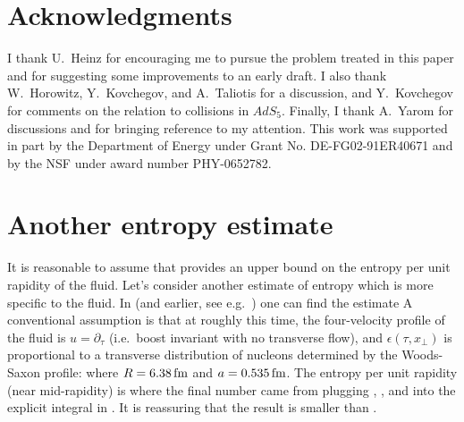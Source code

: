 \documentclass[12pt]{article}
\begin{document}
\section*{Acknowledgments}

I thank U.~Heinz for encouraging me to pursue the problem treated in this paper and for suggesting some improvements to an early draft.  I also thank W.~Horowitz, Y.~Kovchegov, and A.~Taliotis for a discussion, and Y.~Kovchegov for comments on the relation to collisions in $AdS_5$.  Finally, I thank A.~Yarom for discussions and for bringing reference \cite{Loganayagam:2008is} to my attention.  This work was supported in part by the Department of Energy under Grant No. DE-FG02-91ER40671 and by the NSF under award number PHY-0652782.




\appendix
\section{Another entropy estimate}

It is reasonable to assume that  provides an upper bound on the entropy per unit rapidity of the fluid.  Let's consider another estimate of entropy which is more specific to the fluid.  In \cite{Adcox:2004mh} (and earlier, see e.g.~\cite{Heinz:2002un}) one can find the estimate 
A conventional assumption is that at roughly this time, the four-velocity profile of the fluid is $u = \partial_\tau$ (i.e.~boost invariant with no transverse flow), and $\epsilon(\tau,x_\perp)$ is proportional to a transverse distribution of nucleons determined by the Woods-Saxon profile:
where $R = 6.38\,{\rm fm}$ and $a = 0.535\,{\rm fm}$.  The entropy per unit rapidity (near mid-rapidity) is
where the final number came from plugging , , and  into the explicit integral in .  It is reassuring that the result  is smaller than .  





\end{document}
